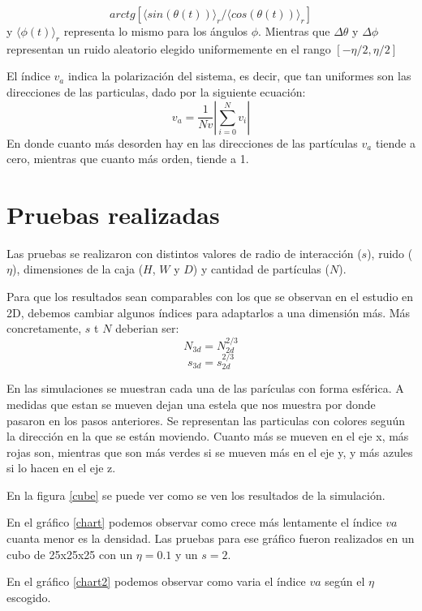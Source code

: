 \documentclass{article}
\begin{document}
\begin{equation}
arctg[\langle sin(\theta (t))\rangle_r / \langle cos(\theta(t))\rangle_r]
\end{equation}
y $\langle \phi (t) \rangle_r$ representa lo mismo para los \'angulos $\phi$. Mientras que $\Delta \theta$ y $\Delta \phi$ representan un ruido aleatorio elegido uniformemente en el rango $[-\eta/2, \eta/2]$
\par
El \'indice $v_a$ indica la polarización del sistema, es decir, que tan uniformes son las direcciones de las particulas, dado por la siguiente ecuaci\'on:
\begin{equation}
v_a = \frac{1}{Nv} \left|\sum_{i=0}^{N} v_i \right|
\end{equation}
En donde cuanto m\'as desorden hay en las direcciones de las part\'iculas $v_a$ tiende a cero, mientras que cuanto m\'as orden, tiende a 1.

\section{Pruebas realizadas}

\par Las pruebas se realizaron con distintos valores de radio de interacci\'on ($s$), ruido ($\eta$), dimensiones de la caja ($H$, $W$ y $D$) y cantidad de part\'iculas ($N$).
\par Para que los resultados sean comparables con los que se observan en el estudio en 2D, debemos cambiar algunos \'indices para adaptarlos a una dimensi\'on m\'as. M\'as concretamente, $s$ t $N$ deberian ser:
\begin{equation}
N_{3d} = N_{2d}^{2/3} 
\end{equation}
\begin{equation}
s_{3d} = s_{2d}^{2/3}
\end{equation}
\par
En las simulaciones se muestran cada una de las par\'iculas con forma esf\'erica. A medidas que estan se mueven dejan una estela que nos muestra por donde pasaron en los pasos anteriores. Se representan las particulas con colores segu\'un la direcci\'on en la que se est\'an moviendo. Cuanto m\'as se mueven en el eje x, m\'as rojas son, mientras que son m\'as verdes si se mueven m\'as en el eje y, y m\'as azules si lo hacen en el eje z.

\par En la figura \ref{cube} se puede ver como se ven los resultados de la simulaci\'on.
\par En el gr\'afico \ref{chart} podemos observar como crece m\'as lentamente el \'indice $va$ cuanta menor es la densidad. Las pruebas para ese gr\'afico fueron realizados en un cubo de 25x25x25 con un $\eta = 0.1$ y un $s = 2$.
\par En el gr\'afico \ref{chart2} podemos observar como varia el \'indice $va$ seg\'un el $\eta$ escogido.
\end{document}
